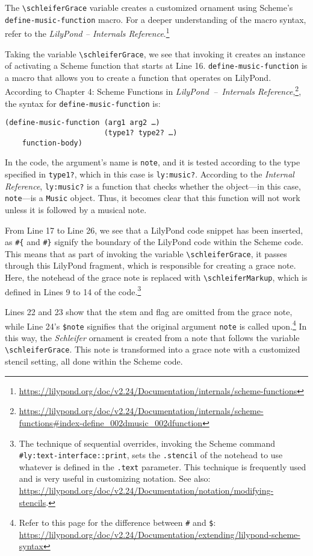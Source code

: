 The \verb|\schleiferGrace| variable creates a customized ornament using Scheme's \verb|define-music-function| macro. For a deeper understanding of the macro syntax, refer to the \textit{LilyPond – Internals Reference}.\footnote{\url{https://lilypond.org/doc/v2.24/Documentation/internals/scheme-functions}} 

Taking the variable \verb|\schleiferGrace|, we see that invoking it creates an instance of activating a Scheme function that starts at Line 16. \verb|define-music-function| is a macro that allows you to create a function that operates on LilyPond. According to Chapter 4: Scheme Functions in \textit{LilyPond – Internals Reference},\footnote{\url{https://lilypond.org/doc/v2.24/Documentation/internals/scheme-functions#index-define_002dmusic_002dfunction}}, the syntax for \verb|define-music-function| is:
\begin{verbatim}
(define-music-function (arg1 arg2 …)
                       (type1? type2? …)
    function-body)
\end{verbatim}

In the code, the argument's name is \verb|note|, and it is tested according to the type specified in \verb|type1?|, which in this case is \verb|ly:music?|. According to the \textit{Internal Reference}, \verb|ly:music?| is a function that checks whether the object—in this case, \verb|note|—is a \verb|Music| object. Thus, it becomes clear that this function will not work unless it is followed by a musical note. 

From Line 17 to Line 26, we see that a LilyPond code snippet has been inserted, as \verb+#{+ and \verb+#}+ signify the boundary of the LilyPond code within the Scheme code. This means that as part of invoking the variable \verb|\schleiferGrace|, it passes through this LilyPond fragment, which is responsible for creating a grace note. Here, the notehead of the grace note is replaced with \verb|\schleiferMarkup|, which is defined in Lines 9 to 14 of the code.\footnote{The technique of sequential overrides, invoking the Scheme command \verb+#ly:text-interface::print+, sets the \verb|.stencil| of the notehead to use whatever is defined in the \verb|.text| parameter. This technique is frequently used and is very useful in customizing notation. See also: \url{https://lilypond.org/doc/v2.24/Documentation/notation/modifying-stencils}.} 

Lines 22 and 23 show that the stem and flag are omitted from the grace note, while Line 24's \verb+$note+ signifies that the original argument \verb|note| is called upon.\footnote{Refer to this page for the difference between \verb+#+ and \verb+$+: \url{https://lilypond.org/doc/v2.24/Documentation/extending/lilypond-scheme-syntax}} In this way, the \textit{Schleifer} ornament is created from a note that follows the variable \verb|\schleiferGrace|. This note is transformed into a grace note with a customized stencil setting, all done within the Scheme code. 

